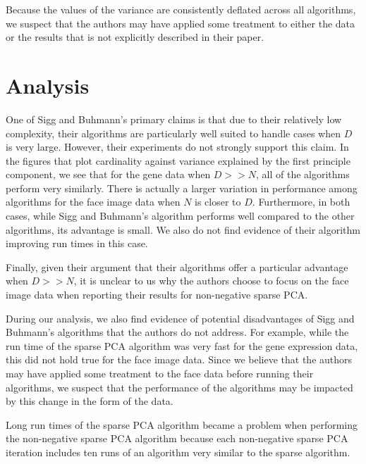 \documentclass{article}
\begin{document}
Because the values of the variance are consistently deflated
across all algorithms, we suspect that the authors may have
applied some treatment to either the data or the results
that is not explicitly described in their paper.




\section{Analysis}

One of Sigg and Buhmann's primary claims is that due to their
relatively low complexity, their algorithms are particularly
well suited to handle cases when $D$ is very large.
However, their experiments do not strongly support this claim.
In the figures that plot cardinality against variance
explained by the first principle component, we see that for the
gene data when $D >> N$, all of the algorithms perform very
similarly. There is actually a larger variation in performance
among algorithms for the face image data when $N$ is closer to $D$.
Furthermore, in both cases, while Sigg and Buhmann's algorithm
performs well compared to the other algorithms, its advantage is small.
We also do not find evidence of their algorithm improving run times
in this case.

Finally, given their argument that their algorithms offer a particular
advantage when $D >> N$, it is unclear to us why the authors choose
to focus on the face image data when reporting their results for
non-negative sparse PCA.

During our analysis, we also find evidence of potential disadvantages
of Sigg and Buhmann's algorithms that the authors do not address.
For example, while the run time of the sparse PCA algorithm was
very fast for the gene expression data, this did not hold true for
the face image data.
Since we believe that the authors may have applied some
treatment to the face data before running their algorithms,
we suspect that the performance of the algorithms may be
impacted by this change in the form of the data.

Long run times of the sparse PCA algorithm
became a problem when performing the non-negative sparse PCA algorithm
because each non-negative sparse PCA iteration includes
ten runs of an algorithm very similar to the sparse algorithm.
\end{document}
